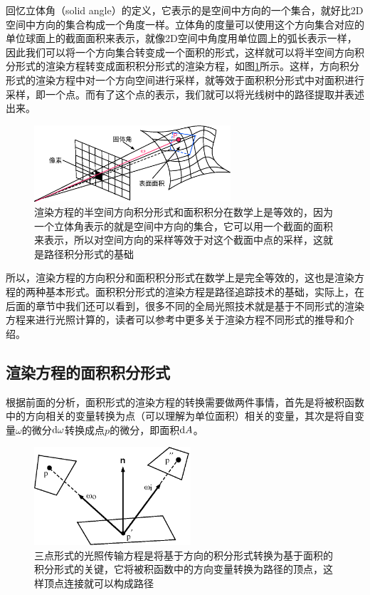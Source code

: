 回忆立体角（solid angle）的定义，它表示的是空间中方向的一个集合，就好比2D空间中方向的集合构成一个角度一样。立体角的度量可以使用这个方向集合对应的单位球面上的截面面积来表示，就像2D空间中角度用单位圆上的弧长表示一样，因此我们可以将一个方向集合转变成一个面积的形式，这样就可以将半空间方向积分形式的渲染方程转变成面积积分形式的渲染方程，如图\ref{f:pt-solid-angle-to-surface}所示。这样，方向积分形式的渲染方程中对一个方向空间进行采样，就等效于面积积分形式中对面积进行采样，即一个点。而有了这个点的表示，我们就可以将光线树中的路径提取并表述出来。

\begin{figure}
	\sidecaption
	\includegraphics[width=0.65\textwidth]{figures/pt/solid-angle-to-surface}
	\caption{渲染方程的半空间方向积分形式和面积积分在数学上是等效的，因为一个立体角表示的就是空间中方向的集合，它可以用一个截面的面积来表示，所以对空间方向的采样等效于对这个截面中点的采样，这就是路径积分形式的基础}
	\label{f:pt-solid-angle-to-surface}
\end{figure}

所以，渲染方程的方向积分和面积积分形式在数学上是完全等效的，这也是渲染方程的两种基本形式。面积积分形式的渲染方程是路径追踪技术的基础，实际上，在后面的章节中我们还可以看到，很多不同的全局光照技术就是基于不同形式的渲染方程来进行光照计算的，读者可以参考\cite{b:AdvancedGlobalIllumination}中更多关于渲染方程不同形式的推导和介绍。






\subsection{渲染方程的面积积分形式}
根据前面的分析，面积形式的渲染方程的转换需要做两件事情，首先是将被积函数中的方向相关的变量转换为点（可以理解为单位面积）相关的变量，其次是将自变量$\omega$的微分${\rm d}\omega$转换成点$p$的微分，即面积${\rm d}A$。

\begin{figure}
	\sidecaption
	\includegraphics[width=0.52\textwidth]{figures/pt/three-point-form}
	\caption{三点形式的光照传输方程是将基于方向的积分形式转换为基于面积的积分形式的关键，它将被积函数中的方向变量转换为路径的顶点，这样顶点连接就可以构成路径}
	\label{f:pt-three-point-form}
\end{figure}

